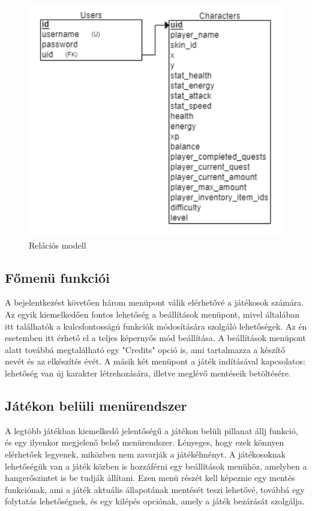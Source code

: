 \begin{figure}[t]
    \centering
    \includegraphics[width=10.0truecm]{images/RelationModell.png}
    \caption{Relációs modell}
    \label{fig:Relációs modell}
\end{figure}

\subsection{Főmenü funkciói}

\indent \indent A bejelentkezést követően három menüpont válik elérhetővé a játékosok számára. Az egyik kiemelkedően fontos lehetőség a beállítások menüpont, mivel általában itt találhatók a kulcsfontosságú funkciók módosítására szolgáló lehetőségek. Az én esetemben itt érhető el a teljes képernyős mód beállítása. A beállítások menüpont alatt továbbá megtalálható egy "Credits" opció is, ami tartalmazza a készítő nevét és az elkészítés évét. A másik két menüpont a játék indításával kapcsolatos: lehetőség van új karakter létrehozására, illetve meglévő mentéseik betöltésére.

\subsection{Játékon belüli menürendszer}

\indent \indent A legtöbb játékban kiemelkedő jelentőségű a játékon belüli pillanat állj funkció, és egy ilyenkor megjelenő belső menürendszer. Lényeges, hogy ezek könnyen elérhetőek legyenek, miközben nem zavarják a játékélményt. A játékosoknak lehetőségük van a játék közben is hozzáférni egy beállítások menühöz, amelyben a hangerőszintet is be tudják állítani. Ezen menü részét kell képeznie egy mentés funkciónak, ami a játék aktuális állapotának mentését teszi lehetővé, továbbá egy folytatás lehetőségnek, és egy kilépés opciónak, amely a játék bezárását szolgálja.



